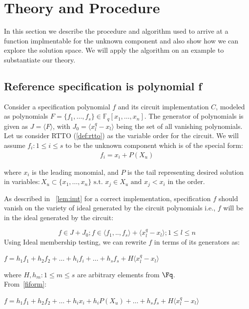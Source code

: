 \section{Theory and Procedure}
\label{sec:theory}
In this section we describe the procedure and algorithm used to arrive at a function implmentable for the unknown component and also show how we can explore the solution space. We will apply the algorithm on an example to substantiate our theory. 
\subsection{Reference specification is polynomial f}
Consider a specification polynomial $f$ and its circuit implementation $C$, modeled as polynomials $F = \{f_1,\dots,f_s\}\in \mathbb{F}_q[x_1,\dots, x_n]$. The generator of polynomials is given as $J=\langle F \rangle$, with $J_0=\langle x_l^q-x_l\rangle$ being the set of all vanishing polynomials. Let us consider RTTO (\autoref{def:rtto}) as the variable order for the circuit. We will assume $f_i:1\le i \le s$ to be the unknown component which is of the special form:
\begin{gather} 
\label{fiform}
f_i = x_i + P(X_u)
\end{gather}

where $x_i$ is the leading monomial, and $P$ is the tail representing desired solution in variables$:X_u \subset \{x_1,\dots,x_n\} \text{ s.t. } x_j \in X_u \text{ and } x_j<x_i$ in the order. 

As described in ~\autoref{lem:imt} for a correct implementation, specification $f$ should vanish on the variety of ideal generated by the circuit polynomials i.e., $f$ will be in the ideal generated by the circuit:

\begin{equation}
\label{member}
f \in J + J_0; 
f \in \langle f_1,..,f_s\rangle + \langle x_l^q-x_l\rangle;1\le l \le n
\end{equation}
Using Ideal membership testing, we can rewrite $f$ in terms of its generators as:

$f = h_1f_1 + h_2f_2 + \dots+h_if_i+\dots+h_sf_s +H\langle x_l^q-x_l\rangle$

where $H, h_m:1\le m \le s$ are arbitrary elements from $\Fq$.\\
From~\eqref{fiform}:

{\small$f = h_1f_1 + h_2f_2 +\dots+h_ix_i+h_iP(X_u)+\dots+h_sf_s+H\langle x_l^q-x_l\rangle$}


